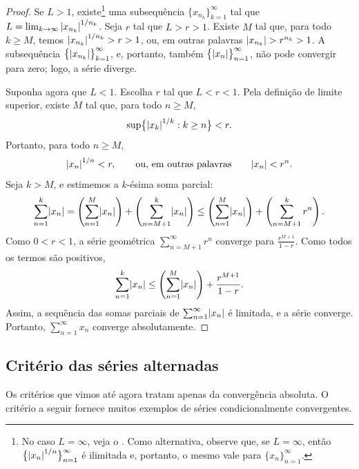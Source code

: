 \begin{proof}
Se $L > 1$, existe\footnote{%
No caso $L=\infty$, veja o .
Como alternativa, observe que, se $L=\infty$, então $\bigl\{ {\lvert {x_{n}} \rvert}^{1/n}
\bigr\}_{n=1}^\infty$
é ilimitada e, portanto, o mesmo vale para
$\{ x_n \}_{n=1}^\infty$.}
uma subsequência $\{ x_{n_k} \}_{k=1}^\infty$ tal que
$L = \lim_{k\to\infty} {\lvert {x_{n_k}} \rvert}^{1/n_k}$. Seja
$r$ tal que $L > r > 1$.  Existe $M$ tal
que, para todo $k \geq M$, temos 
${\lvert {x_{n_k}} \rvert}^{1/n_k} > r > 1$, ou, em outras palavras
$\lvert {x_{n_k}} \rvert > r^{n_k} > 1$.
A subsequência 
$\bigl\{ \lvert {x_{n_k}} \rvert \bigr\}_{k=1}^\infty$,
e, portanto, também
$\bigl\{ \lvert {x_{n}} \rvert \bigr\}_{n=1}^\infty$,
não pode convergir para zero; logo, a série diverge.

Suponha agora que $L < 1$. Escolha $r$ tal que $L < r < 1$.
Pela definição de limite superior,
existe $M$ tal que, para todo $n \geq M$,
\begin{equation*}
\sup \bigl\{ {\lvert {x_k} \rvert}^{1/k} : k \geq n \bigr\} < r .
\end{equation*}
Portanto, para todo $n \geq M$,
\begin{equation*}
{\lvert {x_n} \rvert}^{1/n} < r , \qquad \text{ou, em outras palavras} \qquad \lvert {x_n} \rvert < r^n .
\end{equation*}
Seja $k > M$, e estimemos a $k$-ésima soma parcial:
\begin{equation*}
\sum_{n=1}^k \lvert {x_n} \rvert = 
\left( \sum_{n=1}^M \lvert {x_n} \rvert \right) + 
\left( \sum_{n=M+1}^k \lvert {x_n} \rvert \right)
\leq
\left( \sum_{n=1}^M \lvert {x_n} \rvert \right) + 
\left( \sum_{n=M+1}^k r^n \right) .
\end{equation*}
Como $0 < r < 1$,
a série geométrica $\sum_{n=M+1}^\infty r^n$ converge para
$\frac{r^{M+1}}{1-r}$. Como todos os termos são positivos,
\begin{equation*}
\sum_{n=1}^k \lvert {x_n} \rvert 
\leq
\left( \sum_{n=1}^M \lvert {x_n} \rvert \right) + 
\frac{r^{M+1}}{1-r} .
\end{equation*}
Assim, a sequência das somas parciais de $\sum_{n=1}^\infty \lvert {x_n} \rvert$ é limitada, e
a série converge. Portanto, $\sum_{n=1}^\infty x_n$ converge absolutamente.
\end{proof}

\subsection{Critério das séries alternadas}

Os critérios que vimos até agora tratam apenas da convergência absoluta. O
critério a seguir fornece muitos exemplos de séries condicionalmente convergentes.

